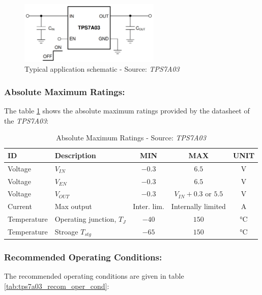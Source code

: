 \documentclass[report.tex]{subfiles}
\begin{document}
\begin{figure}[H]
	\centering
	\includegraphics[width=0.6\textwidth]{Include/Figure/comp/tps7a03_typ_app.png}
	\caption{Typical application schematic - Source: \textit{TPS7A03}\cite{TPS7A03}}
	\label{fig:tps7a03_typ_app}
\end{figure}

\subsubsection{Absolute Maximum Ratings:}

The table \ref{tab:tps7a03_absolute_max_rating} shows the absolute maximum ratings provided by the datasheet of the \textit{TPS7A03}:

\begin{table}[H]
\centering
\begin{tabularx}{\textwidth}{|l|X|c|c|c|}
\hline
\textbf{ID} & \textbf{Description} & \textbf{MIN} & \textbf{MAX} & \textbf{UNIT} \\\hline
Voltage &  $V_{IN}$ & $-0.3 $ & $6.5$ & \si{\volt} \\\hline
Voltage &  $V_{EN}$ & $-0.3 $ & $6.5$ & \si{\volt} \\\hline
Voltage &  $V_{OUT}$ & $-0.3 $ & $V_{IN} + 0.3$ or $5.5$ & \si{\volt} \\\hline
Current & Max output & Inter. lim. & Internally limited & \si{\ampere} \\\hline
Temperature & Operating junction, $T_J$ & $-40$ & $150$ & \si{\celsius} \\\hline
Temperature & Stroage $T_{stg}$ & $-65$ & $150$ & \si{\celsius} \\\hline
\end{tabularx}
\caption{Absolute Maximum Ratings - Source: \textit{TPS7A03}\cite{TPS7A03}}
\label{tab:tps7a03_absolute_max_rating}
\end{table}

\subsubsection{Recommended Operating Conditions:}
The recommended operating conditions are given in table \ref{tab:tps7a03_recom_oper_cond}:
\end{document}
